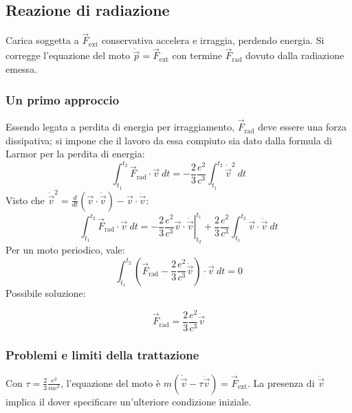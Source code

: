 \documentclass[10pt, a4paper]{scrartcl}
\newcommand*\Eval[3]{\left.#1\right\rvert_{#2}^{#3}}
\numberwithin{equation}{subsection}
\theoremstyle{style1}
\newenvironment{boxenv}[1][]{
    \begin{eqbox}[#1]
    }{
   \end{eqbox}
}
\begin{document}
\subsection{Reazione di radiazione}

Carica soggetta a $\vec{F}_\text{ext}$ conservativa accelera e irraggia, perdendo energia. Si corregge l'equazione del moto $\dot{\vec{p}} = \vec{F}_\text{ext}$ con termine $\vec{F}_\text{rad}$ dovuto dalla radiazione emessa.

\subsubsection{Un primo approccio}

Essendo legata a perdita di energia per irraggiamento, $\vec{F}_\text{rad}$ deve essere una forza dissipativa; si impone che il lavoro da essa compiuto sia dato dalla formula di Larmor per la perdita di energia:
\begin{equation*}
	\int_{t_1} ^{t_2} \vec{F}_\text{rad} \cdot \vec{v} \ dt = -\frac{2}{3} \frac{e^2}{c^3} \int_{t_1} ^{t_2} \dot{\vec{v}}^2 \ dt
\end{equation*}
Visto che $\dot{\vec{v}}^2 = \frac{d }{d t} (\vec{v}\cdot \dot{\vec{v}}) - \vec{v}\cdot \ddot{\vec{v}} $:
\begin{equation*}
	\int_{t_1} ^{t_2} \vec{F}_\text{rad}\cdot \vec{v}\ dt = -\Eval{\frac{2}{3}\frac{e^2}{c^3} \vec{v}\cdot \dot{\vec{v}}}{t_2}{t_1} + \frac{2}{3}\frac{e^2}{c^3} \int_{t_1} ^{t_2} \vec{v}\cdot \ddot{\vec{v}}\ dt
\end{equation*}
Per un moto periodico, vale:
\begin{equation*}
	\int_{t_1} ^{t_2} \left(\vec{F}_\text{rad}- \frac{2}{3}\frac{e^2}{c^3}\ddot{\vec{v}}\right) \cdot \vec{v} \ dt = 0
\end{equation*}
Possibile soluzione: 
\begin{boxenv}[]
\begin{equation}
\vec{F}_\text{rad}=\frac{2}{3}\frac{e^2}{c^3} \ddot{\vec{v}}
\end{equation}
\end{boxenv}
\subsubsection{Problemi e limiti della trattazione}

Con $\tau  = \frac{2}{3}\frac{e^2}{mc^3}$, l'equazione del moto \`e $m(\dot{\vec{v}}- \tau \ddot{\vec{v}}) = \vec{F}_\text{ext}$. La presenza di $\ddot{\vec{v}}$ implica il dover specificare un'ulteriore condizione iniziale.
\end{document}
